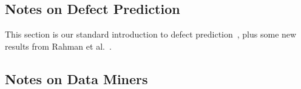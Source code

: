 \documentclass{sig-alternative}
\newcommand{\fig}[1]{Figure~\ref{fig:#1}}
\begin{document}
 






 


 
 

\subsection{Notes on Defect Prediction}


This section is our standard introduction to defect prediction~\cite{me15:book1},
plus    some new results from Rahman et al.~\cite{rahman14:icse}. 
 





 

 \subsection{Notes on Data Miners}
 
\end{document}
